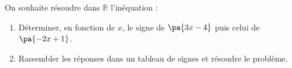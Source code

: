 \begin{exo}{}
	On souhaite résoudre dans $\mathbb{R}$ l'inéquation : 
	\begin{enumerate}
		\item Déterminer, en fonction de $x$, le signe de $\pa{3x - 4}$ puis celui de $\pa{-2x + 1}$.
		\item Rassembler les réponses dans un tableau de signes et résoudre le problème.
	\end{enumerate}
\end{exo}
